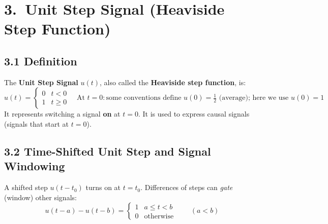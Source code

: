 \documentclass[10pt,a4paper]{article}
\begin{document}
\section{3.\ Unit Step Signal (Heaviside Step Function)}

\subsection*{3.1 Definition}

\begin{stepbox}
The \textbf{Unit Step Signal} $u(t)$, also called the \textbf{Heaviside step function}, is:
\[
u(t) = \begin{cases}0 & t < 0\\ 1 & t \geq 0\end{cases}
\quad \text{At } t=0: \text{some conventions define } u(0)=\tfrac{1}{2} \text{ (average); here we use } u(0)=1
\]
It represents switching a signal \textbf{on} at $t=0$. It is used to express causal signals (signals that start at $t=0$).
\end{stepbox}

\begin{center}
\end{center}

\subsection*{3.2 Time-Shifted Unit Step and Signal Windowing}

A shifted step $u(t - t_0)$ turns on at $t = t_0$.  Differences of steps can \emph{gate} (window) other signals:
\[
u(t-a) - u(t-b) = \begin{cases}1 & a \leq t < b \\ 0 & \text{otherwise}\end{cases} \qquad (a < b)
\]
\end{document}
